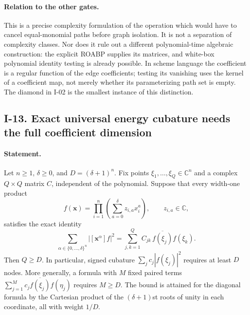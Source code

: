 \documentclass[11pt,a4paper]{article}
\theoremstyle{definition}\newtheorem{definition}{Definition}
\begin{document}
\paragraph{Relation to the other gates.}
This is a precise complexity formulation of the operation which
would have to cancel equal-monomial paths before graph isolation.
It is not a separation of complexity classes.  Nor does it rule
out a different polynomial-time algebraic construction: the
explicit ROABP supplies its matrices, and white-box polynomial
identity testing is already possible.  In scheme language the
coefficient is a regular function of the edge coefficients;
testing its vanishing uses the kernel of a coefficient map, not
merely whether its parameterizing path set is empty.  The diamond
in I-02 is the smallest instance of this distinction.

\subsection{I-13. Exact universal energy cubature needs the full coefficient dimension}
\label{I-13}

\paragraph{Statement.}
Let $n\ge1$, $\delta\ge0$, and $D=(\delta+1)^n$.  Fix points
$\xi_1,\ldots,\xi_Q\in\mathbb C^n$ and a complex $Q\times Q$ matrix $C$,
independent of the polynomial.  Suppose that every width-one product
\[
 f(\mathbf x)=\prod_{i=1}^n\left(\sum_{a=0}^{\delta}z_{i,a}x_i^a\right),
 \qquad z_{i,a}\in\mathbb C,
\]
satisfies the exact identity
\[
 \sum_{\alpha\in\{0,\ldots,\delta\}^n}|[\mathbf x^\alpha]f|^2
  =\sum_{j,k=1}^Q C_{jk}\,\overline{f(\xi_j)}f(\xi_k).
\tag{I.13}\label{eq:I-cubature}
\]
Then $Q\ge D$.  In particular, signed cubature
$\sum_j c_j|f(\xi_j)|^2$ requires at least $D$ nodes.  More generally,
a formula with $M$ fixed paired terms
$\sum_{j=1}^M c_j\overline{f(\xi_j)}f(\eta_j)$ requires $M\ge D$.
The bound is attained for the diagonal formula by the Cartesian product
of the $(\delta+1)$st roots of unity in each coordinate, all with weight
$1/D$.
\end{document}
